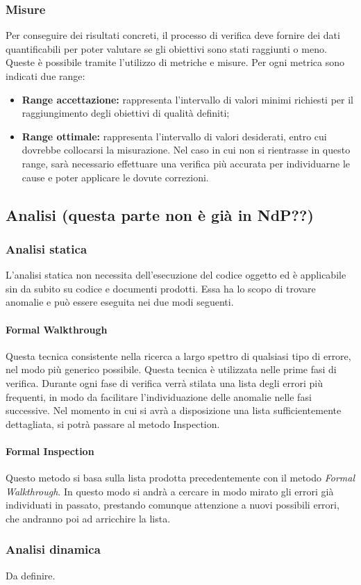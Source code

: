 		\subsubsection{Misure}
		Per conseguire dei risultati concreti, il processo di verifica deve fornire dei dati quantificabili per poter valutare se gli obiettivi sono stati raggiunti o meno. Queste è possibile tramite l’utilizzo di metriche e misure. Per ogni metrica sono indicati due range:
		\begin{itemize}
			\item \textbf{Range accettazione:} rappresenta l'intervallo di valori minimi richiesti per il raggiungimento degli obiettivi di qualità definiti;
			\item \textbf{Range ottimale:} rappresenta l'intervallo di valori desiderati, entro cui dovrebbe collocarsi la misurazione. Nel caso in cui non si rientrasse in questo range, sarà necessario effettuare una verifica più accurata per individuarne le cause e poter applicare le dovute correzioni.
		\end{itemize}
	
	\subsection{Analisi (questa parte non è già in NdP??)}
	
	\subsubsection{Analisi statica}
	L'analisi statica non necessita dell'esecuzione del codice oggetto ed è applicabile sin da subito su codice e documenti prodotti. Essa ha lo scopo di trovare anomalie e può essere eseguita nei due modi seguenti.
	
	\paragraph{Formal Walkthrough}
	Questa tecnica consistente nella ricerca a largo spettro di qualsiasi tipo di errore, nel modo più generico possibile. 
	Questa tecnica è utilizzata nelle prime fasi di verifica. Durante ogni fase di verifica verrà stilata una lista degli errori più frequenti, in modo da facilitare l’individuazione delle anomalie nelle fasi successive. 
	Nel momento in cui si avrà a disposizione una lista sufficientemente dettagliata, si potrà passare al metodo Inspection.
	
	
	\paragraph{Formal Inspection}
	Questo metodo si basa sulla lista prodotta precedentemente con il metodo \textit{Formal Walkthrough}. In questo modo si andrà a cercare in modo mirato gli errori già individuati in passato, prestando comunque attenzione a nuovi possibili errori, che andranno poi ad arricchire la lista.
	
	
	\subsubsection{Analisi dinamica}
	Da definire.
	
	
	
	
	